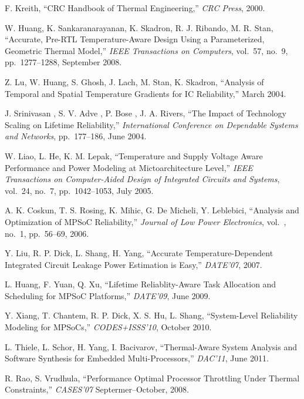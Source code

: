 \begin{thebibliography}{99}
    F. Kreith,
    ``CRC Handbook of Thermal Engineering,''
    \emph{CRC Press},
    2000.

    W. Huang, K. Sankaranarayanan, K. Skadron, R. J. Ribando, M. R. Stan,
    ``Accurate, Pre-RTL Temperature-Aware Design Using a Parameterized, Geometric Thermal Model,''
    \emph{IEEE Transactions on Computers},
    vol.~57, no.~9, pp.~1277--1288, September 2008.

    Z. Lu, W. Huang, S. Ghosh, J. Lach, M. Stan, K. Skadron,
    ``Analysis of Temporal and Spatial Temperature Gradients for IC Reliability,''
    March 2004.

    J. Srinivasan , S. V. Adve , P. Bose , J. A. Rivers,
    ``The Impact of Technology Scaling on Lifetime Reliability,''
    \emph{International Conference on Dependable Systems and Networks},
    pp.~177--186, June 2004.

    W. Liao, L. He, K. M. Lepak,
    ``Temperature and Supply Voltage Aware Performance and Power Modeling at Mictoarchitecture Level,''
    \emph{IEEE Transactions on Computer-Aided Design of Integrated Circuits and Systems},
    vol.~24, no.~7, pp.~1042--1053, July 2005.

    A. K. Coskun, T. S. Rosing, K. Mihic, G. De Micheli, Y. Leblebici,
    ``Analysis and Optimization of MPSoC Reliability,''
    \emph{Journal of Low Power Electronics},
    vol.~, no.~1, pp.~56--69, 2006.

    Y. Liu, R. P. Dick, L. Shang, H. Yang,
    ``Accurate Temperature-Dependent Integrated Circuit Leakage Power Estimation is Easy,''
    \emph{DATE'07},
    2007.

    L. Huang, F. Yuan, Q. Xu,
    ``Lifetime Reliablity-Aware Task Allocation and Scheduling for MPSoC Platforms,''
    \emph{DATE'09},
    June 2009.

    Y. Xiang, T. Chantem, R. P. Dick, X. S. Hu, L. Shang,
    ``System-Level Reliability Modeling for MPSoCs,''
    \emph{CODES+ISSS'10},
    October 2010.

    L. Thiele, L. Schor, H. Yang, I. Bacivarov,
    ``Thermal-Aware System Analysis and Software Synthesis for Embedded Multi-Processors,''
    \emph{DAC'11},
    June 2011.

    R. Rao, S. Vrudhula,
    ``Performance Optimal Processor Throttling Under Thermal Constraints,''
    \emph{CASES'07}
    Septermer--October, 2008.


\end{thebibliography}
